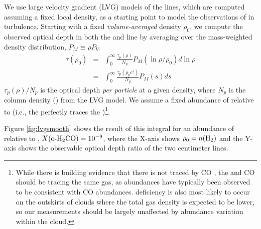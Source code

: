 We use large velocity gradient (LVG) models of the \formaldehyde lines, which are computed assuming a
fixed local density, as a starting point to model the observations of
\formaldehyde in turbulence.   Starting with a fixed \emph{volume-averaged}
density $\rho_0$, we compute the observed \formaldehyde optical depth in both
the \oneone and \twotwo
line by averaging over the mass-weighted density distribution, $P_M\equiv\rho P_V$.
\begin{eqnarray}
    \label{eqn:tauintegral}
    \tau(\rho_0) &=& \int_{0}^\infty \frac{\tau_p(\rho)}{N_p} P_M(\ln \rho/\rho_0) d \ln \rho\\
                 &=& \int_{0}^\infty \frac{\tau_p(\rho_0 e^s)}{N_p} P_M(s) d s
\end{eqnarray} %
$\tau_p(\rho)/N_p$ is the optical depth \emph{per particle} at a given density, where $N_p$ is the column
density (\perkmspc) from the LVG model.
We assume a fixed abundance of \ortho relative to \hh
(i.e., the \formaldehyde perfectly traces the \hh)\footnote{While there is
building evidence that there is \hh not traced by CO
\citep{Shetty2011b,Shetty2011a}, the \formaldehyde and CO should be tracing the
same gas, as \formaldehyde abundances have typically been observed to be
consistent with CO abundances.  \formaldehyde deficiency is also most likely to
occur on the outskirts of clouds where the total gas density is expected to be
lower, so our measurements should be largely unaffected by abundance variation
within the cloud.}.

Figure \ref{fig:lvgsmooth}
shows the result of this integral for an abundance of \ortho relative to \hh, 
$X(\textrm{o-H}_2\textrm{CO})=10^{-9}$, where the X-axis shows $\rho_0 = n(\textrm{H}_{2})$ and the Y-axis
shows the observable optical depth ratio of the two \formaldehyde centimeter
lines.



